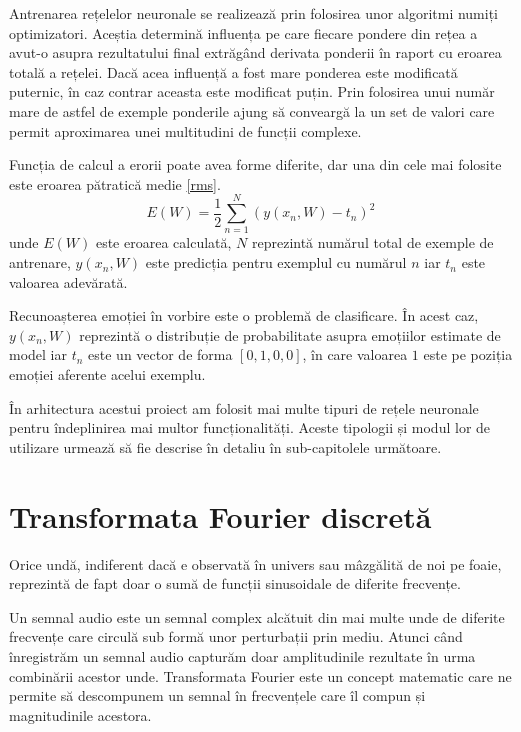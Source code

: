 \documentclass[a4paper,12pt]{book}
\begin{document}
			Antrenarea rețelelor neuronale se realizează prin folosirea unor algoritmi numiți optimizatori. Aceștia determină influența pe care fiecare pondere din rețea a avut-o asupra rezultatului final extrăgând derivata ponderii în raport cu eroarea totală a rețelei. Dacă acea influență a fost mare ponderea este modificată puternic, în caz contrar aceasta este modificat puțin. Prin folosirea unui număr mare de astfel de exemple ponderile ajung să conveargă la un set de valori care permit aproximarea unei multitudini de funcții complexe. \par
			
			Funcția de calcul a erorii poate avea forme diferite, dar una din cele mai folosite este eroarea pătratică medie \ref{rms}.
			\begin{equation} \label{rms}
				E(W) = \frac{1}{2} \sum_{n=1}^{N} (y(x_n, W) - t_n)^2
			\end{equation}
			unde $E(W)$ este eroarea calculată, $N$ reprezintă numărul total de exemple de antrenare, $y(x_n, W)$ este predicția pentru exemplul cu numărul $n$ iar $t_n$ este valoarea adevărată. \par
			
			Recunoașterea emoției în vorbire este o problemă de clasificare. În acest caz, $y(x_n, W)$ reprezintă o distribuție de probabilitate asupra emoțiilor estimate de model iar $t_n$ este un vector de forma $[0,1,0,0]$, în care valoarea $1$ este pe poziția emoției aferente acelui exemplu. \par
			
			În arhitectura acestui proiect am folosit mai multe tipuri de rețele neuronale pentru îndeplinirea mai multor funcționalități. Aceste tipologii și modul lor de utilizare urmează să fie descrise în detaliu în sub-capitolele următoare.
			\section{Transformata Fourier discretă} 
			
			Orice undă, indiferent dacă e observată în univers sau mâzgălită de noi pe foaie, reprezintă de fapt doar o sumă de funcții sinusoidale de diferite frecvențe.\par
			
			Un semnal audio este un semnal complex alcătuit din mai multe unde de diferite frecvențe care circulă sub formă unor perturbații prin mediu. Atunci când înregistrăm un semnal audio capturăm doar amplitudinile rezultate în urma combinării acestor unde. Transformata Fourier este un concept matematic care ne permite să descompunem un semnal în frecvențele care îl compun și magnitudinile acestora.\par 
			
\end{document}
